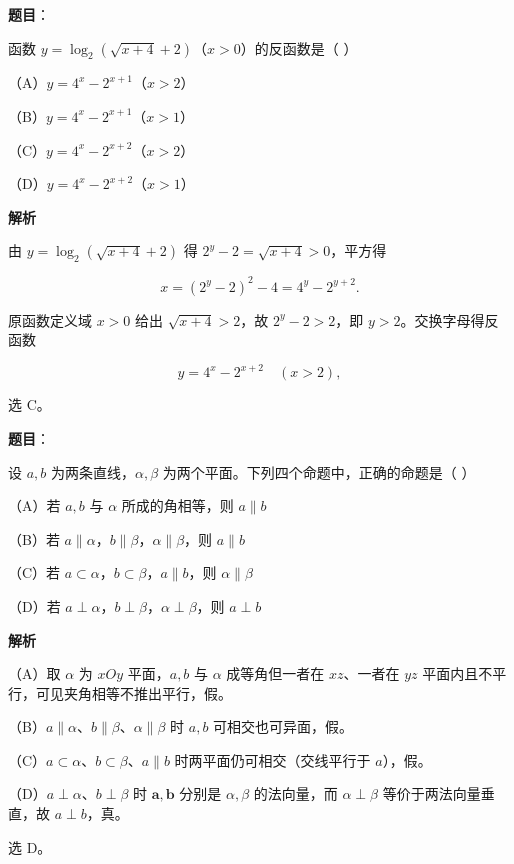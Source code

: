 \begin{answer}

\textbf{题目}：

函数 $y=\log_2(\sqrt{x+4}+2)$（$x>0$）的反函数是（ ）

（A）$y=4^x-2^{x+1}$（$x>2$）

（B）$y=4^x-2^{x+1}$（$x>1$）

（C）$y=4^x-2^{x+2}$（$x>2$）

（D）$y=4^x-2^{x+2}$（$x>1$）

\textbf{解析}

由 $y=\log_2\left(\sqrt{x+4}+2\right)$ 得 $2^y-2=\sqrt{x+4}>0$，平方得

\nopagebreak[4]
\[x=(2^y-2)^2-4=4^y-2^{y+2}.\]

原函数定义域 $x>0$ 给出 $\sqrt{x+4}>2$，故 $2^y-2>2$，即 $y>2$。交换字母得反函数

\nopagebreak[4]
\[y=4^x-2^{x+2}\quad(x>2),\]

选 C。


\end{answer}
\begin{answer}

\textbf{题目}：

设 $a,b$ 为两条直线，$\alpha,\beta$ 为两个平面。下列四个命题中，正确的命题是（ ）

（A）若 $a,b$ 与 $\alpha$ 所成的角相等，则 $a\parallel b$

（B）若 $a\parallel\alpha$，$b\parallel\beta$，$\alpha\parallel\beta$，则 $a\parallel b$

（C）若 $a\subset\alpha$，$b\subset\beta$，$a\parallel b$，则 $\alpha\parallel\beta$

（D）若 $a\perp\alpha$，$b\perp\beta$，$\alpha\perp\beta$，则 $a\perp b$

\textbf{解析}

（A）取 $\alpha$ 为 $xOy$ 平面，$a,b$ 与 $\alpha$ 成等角但一者在 $xz$、一者在 $yz$ 平面内且不平行，可见夹角相等不推出平行，假。

（B）$a\parallel\alpha$、$b\parallel\beta$、$\alpha\parallel\beta$ 时 $a,b$ 可相交也可异面，假。

（C）$a\subset\alpha$、$b\subset\beta$、$a\parallel b$ 时两平面仍可相交（交线平行于 $a$），假。

（D）$a\perp\alpha$、$b\perp\beta$ 时 $\boldsymbol a,\boldsymbol b$ 分别是 $\alpha,\beta$ 的法向量，而 $\alpha\perp\beta$ 等价于两法向量垂直，故 $a\perp b$，真。

选 D。


\end{answer}
